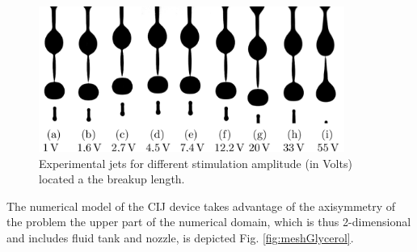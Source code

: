 \documentclass[twocolumn,10pt]{asme2ej}
\begin{document}
\begin{figure}[t]
    \centering
    \includegraphics[width=10cm]{Glycerol/gouttes_exp.png}
    \caption{Experimental jets for different stimulation amplitude (in Volts) located a the breakup length.}
    \label{fig:glycerolCIJExp}
\end{figure}

The numerical model of the CIJ device takes advantage of the axisymmetry of the problem the upper part of the numerical domain, which is thus 2-dimensional and includes fluid tank and nozzle, is depicted Fig. \ref{fig:meshGlycerol}. 
\end{document}
